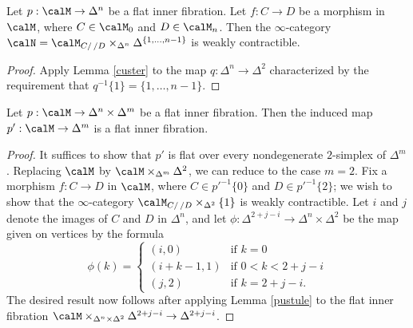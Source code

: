\begin{lemma}\label{pustule}
Let $p: \calM \rightarrow \Delta^n$ be a flat inner fibration. Let
$f: C \rightarrow D$ be a morphism in $\calM$, where $C \in \calM_0$ and
$D \in \calM_n$. Then the $\infty$-category
$\calN = \calM_{ C/ \, /D} \times_{ \Delta^n} \Delta^{ \{1,\ldots, n-1\} }$ is weakly contractible.
\end{lemma}

\begin{proof}
Apply Lemma \ref{custer} to the map $q: \Delta^n \rightarrow \Delta^2$ characterized
by the requirement that $q^{-1} \{1\} = \{ 1, \ldots, n-1 \}$. 
\end{proof}

\begin{lemma}\label{spaz}
Let $p: \calM \rightarrow \Delta^n \times \Delta^m$ be a flat inner fibration.
Then the induced map $p': \calM \rightarrow \Delta^m$ is a flat inner fibration.
\end{lemma}

\begin{proof}
It suffices to show that $p'$ is flat over every nondegenerate $2$-simplex of
$\Delta^m$. Replacing $\calM$ by $\calM \times_{ \Delta^m} \Delta^2$, we can
reduce to the case $m = 2$. Fix a morphism $f: C \rightarrow D$ in
$\calM$, where $C \in {p'}^{-1} \{0\}$ and $D \in {p'}^{-1} \{2\}$; we wish to show
that the $\infty$-category $\calM_{C/ \, /D} \times_{ \Delta^2} \{1\}$ is weakly contractible.
Let $i$ and $j$ denote the images of $C$ and $D$ in $\Delta^n$, and let
$\phi: \Delta^{ 2+j-i} \rightarrow \Delta^n \times \Delta^2$ be the map
given on vertices by the formula
$$ \phi(k) = \begin{cases} (i,0) & \text{if } k = 0 \\
(i+k-1, 1) & \text{if } 0 < k < 2 + j - i \\
(j, 2) & \text{if } k = 2+j - i. \end{cases}$$
The desired result now follows after applying Lemma \ref{pustule} to the
flat inner fibration $\calM \times_{ \Delta^n \times \Delta^2} \Delta^{ 2 + j - i } \rightarrow
\Delta^{ 2 + j - i}$. 
\end{proof}


